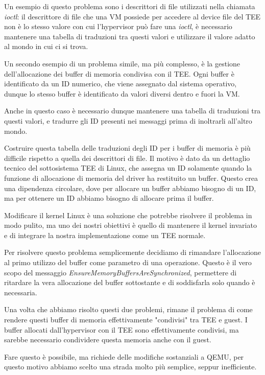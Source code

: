 \documentclass[12pt,italian]{report}
\begin{document}
Un esempio di questo problema sono i descrittori di file utilizzati nella
chiamata \textit{ioctl}: 
il descrittore di file che una VM possiede per accedere al device file del TEE
non è lo stesso valore con cui l'hypervisor può fare una \textit{ioctl},
è necessario mantenere una tabella di traduzioni tra questi valori e
utilizzare il valore adatto al mondo in cui ci si trova.

Un secondo esempio di un problema simile, ma più complesso, è la gestione
dell'allocazione dei buffer di memoria condivisa con il TEE.
Ogni buffer è identificato da un ID numerico, che viene assegnato dal sistema
operativo, dunque lo stesso buffer è identificato da valori diversi dentro
e fuori la VM.

Anche in questo caso è necessario dunque mantenere una tabella di traduzioni
tra questi valori, e tradurre gli ID presenti nei messaggi prima di inoltrarli
all'altro mondo.

Costruire questa tabella delle traduzioni degli ID per i buffer di memoria è
più difficile rispetto a quella dei descrittori di file.
Il motivo è dato da un dettaglio tecnico del sottosistema TEE di Linux, che
assegna un ID solamente quando la funzione di allocazione di memoria del driver
ha restituito un buffer.
Questo crea una dipendenza circolare, dove per allocare un buffer abbiamo bisogno
di un ID, ma per ottenere un ID abbiamo bisogno di allocare prima il buffer.

Modificare il kernel Linux è una soluzione che potrebbe risolvere il problema
in modo pulito, ma uno dei nostri obiettivi è quello di mantenere il kernel
invariato e di integrare la nostra implementazione come un TEE normale. 

Per risolvere questo problema semplicemente decidiamo di rimandare l'allocazione
al primo utilizzo del buffer come parametro di una operazione.
Questo è il vero scopo del messaggio \textit{EnsureMemoryBuffersAreSynchronized},
permettere di ritardare la vera allocazione del buffer sottostante e di soddisfarla
solo quando è necessaria.

\bigbreak \noindent

Una volta che abbiamo risolto questi due problemi, rimane il problema di
come rendere questi buffer di memoria effettivamente "condivisi" tra TEE
e guest.
I buffer allocati dall'hypervisor con il TEE sono effettivamente condivisi,
ma sarebbe necessario condividere questa memoria anche con il guest.

Fare questo è possibile, ma richiede delle modifiche sostanziali a QEMU, per
questo motivo abbiamo scelto una strada molto più semplice, seppur
inefficiente.
\end{document}
